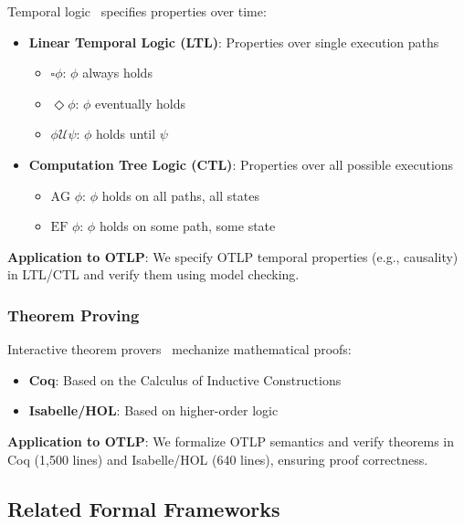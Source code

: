 Temporal logic~\cite{pnueli1977temporal,clarke1999model} specifies properties over time:

\begin{itemize}
\item \textbf{Linear Temporal Logic (LTL)}: Properties over single execution paths
  \begin{itemize}
  \item $\square \phi$: $\phi$ always holds
  \item $\Diamond \phi$: $\phi$ eventually holds
  \item $\phi \mathcal{U} \psi$: $\phi$ holds until $\psi$
  \end{itemize}
\item \textbf{Computation Tree Logic (CTL)}: Properties over all possible executions
  \begin{itemize}
  \item $\text{AG } \phi$: $\phi$ holds on all paths, all states
  \item $\text{EF } \phi$: $\phi$ holds on some path, some state
  \end{itemize}
\end{itemize}

\textbf{Application to OTLP}: We specify OTLP temporal properties (e.g., causality) in LTL/CTL and verify them using model checking.

\subsubsection{Theorem Proving}
\label{sec:theorem-proving}

Interactive theorem provers~\cite{bertot2013coq,nipkow2002isabelle} mechanize mathematical proofs:

\begin{itemize}
\item \textbf{Coq}: Based on the Calculus of Inductive Constructions
\item \textbf{Isabelle/HOL}: Based on higher-order logic
\end{itemize}

\textbf{Application to OTLP}: We formalize OTLP semantics and verify theorems in Coq (1,500 lines) and Isabelle/HOL (640 lines), ensuring proof correctness.

\subsection{Related Formal Frameworks}
\label{sec:related-frameworks}

